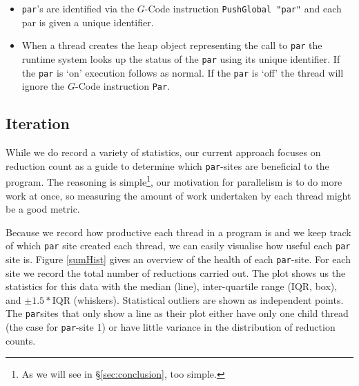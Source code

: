     \begin{itemize}
        \item \verb=par='s are identified via the $G$-Code instruction
                \verb=PushGlobal "par"= and each par is given a unique identifier.
        \item When a thread creates the heap object representing the call to
                \verb=par= the runtime system looks up the status of the \verb=par= using its
                unique identifier. If the \verb=par= is `on' execution follows as normal. If the
                \verb=par= is `off' the thread will ignore the $G$-Code instruction \verb=Par=.
    \end{itemize}

\subsection*{Iteration}

While we do record a variety of statistics, our current approach focuses on reduction
count as a guide to determine which \verb-par--sites are beneficial to the program.
The reasoning is simple\footnote{As we will see in \S \ref{sec:conclusion}, too simple.},
our motivation for parallelism is to do more work at once, so measuring the amount
of work undertaken by each thread might be a good metric.

Because we record how productive each thread in a program is and we keep track
of which \verb-par- site created each thread, we can easily visualise how useful
each \verb-par- site is. Figure \ref{sumHist} gives an overview of the health
of each \verb-par--site. For each site we record the total number of reductions
carried out. The plot shows us the statistics for this data with the median
(line), inter-quartile range (IQR, box), and $\pm1.5 * $IQR (whiskers).
Statistical outliers are shown as independent points. The \verb-par-sites that
only show a line as their plot either have only one child thread (the case for
\verb-par--site 1) or have little variance in the distribution of reduction
counts.

